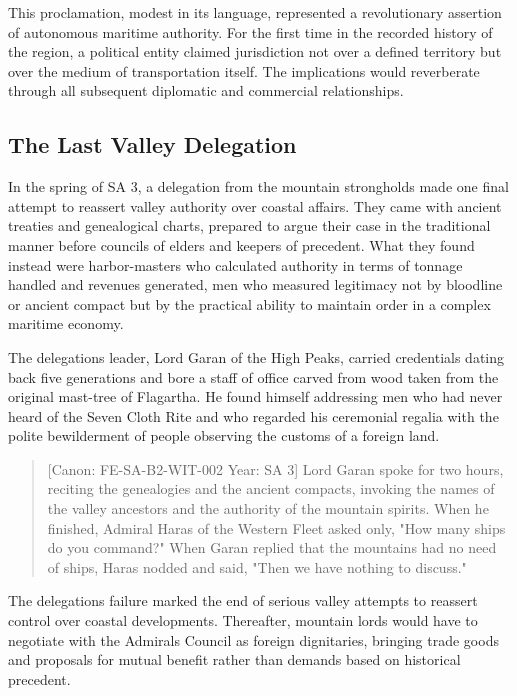 This proclamation, modest in its language, represented a revolutionary
assertion of autonomous maritime authority. For the first time in the
recorded history of the region, a political entity claimed jurisdiction
not over a defined territory but over the medium of transportation
itself. The implications would reverberate through all subsequent
diplomatic and commercial relationships.

\subsection{The Last Valley
Delegation}\label{the-last-valley-delegation}

In the spring of SA 3, a delegation from the mountain strongholds made
one final attempt to reassert valley authority over coastal affairs.
They came with ancient treaties and genealogical charts, prepared to
argue their case in the traditional manner before councils of elders and
keepers of precedent. What they found instead were harbor-masters who
calculated authority in terms of tonnage handled and revenues generated,
men who measured legitimacy not by bloodline or ancient compact but by
the practical ability to maintain order in a complex maritime economy.

The delegation\textquotesingle s leader, Lord Garan of the High Peaks,
carried credentials dating back five generations and bore a staff of
office carved from wood taken from the original mast-tree of Flagartha.
He found himself addressing men who had never heard of the Seven Cloth
Rite and who regarded his ceremonial regalia with the polite
bewilderment of people observing the customs of a foreign land.

\begin{quote}
{[}Canon: FE-SA-B2-WIT-002 \textbar{} Year: SA 3{]} Lord Garan spoke for
two hours, reciting the genealogies and the ancient compacts, invoking
the names of the valley ancestors and the authority of the mountain
spirits. When he finished, Admiral Haras of the Western Fleet asked
only, "How many ships do you command?" When Garan replied that the
mountains had no need of ships, Haras nodded and said, "Then we have
nothing to discuss."
\end{quote}

The delegation\textquotesingle s failure marked the end of serious
valley attempts to reassert control over coastal developments.
Thereafter, mountain lords would have to negotiate with the
Admiral\textquotesingle s Council as foreign dignitaries, bringing trade
goods and proposals for mutual benefit rather than demands based on
historical precedent.

